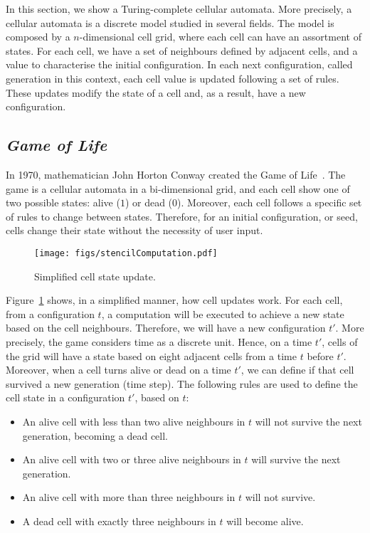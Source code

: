 \documentclass[12pt]{article}
\begin{document}
In this section, we show a Turing-complete cellular automata. More precisely, a cellular automata is a discrete model studied in several fields. The model is composed by a $n$-dimensional cell grid, where each cell can have an assortment of states. For each cell, we have a set of neighbours defined by adjacent cells, and a value to characterise the initial configuration. In each next configuration, called generation in this context, each cell value is updated following a set of rules. These updates modify the state of a cell and, as a result, have a new configuration.

\subsection{\emph{Game of Life}}

In 1970, mathematician John Horton Conway created the Game of Life~\cite{Gardner:article:1970:oct}. The game is a cellular automata in a bi-dimensional grid, and each cell show one of two possible states: alive ($1$) or dead ($0$). Moreover, each cell follows a specific set of rules to change between states. Therefore, for an initial configuration, or seed, cells change their state without the necessity of user input.

\begin{figure}[h]
    \centering
    \texttt{[image: figs/stencilComputation.pdf]}
    \caption{Simplified cell state update.}
    \label{fig:stencil}
\end{figure}

Figure~\ref{fig:stencil} shows, in a simplified manner, how cell updates work. For each cell, from a configuration $t$, a computation will be executed to achieve a new state based on the cell neighbours. Therefore, we will have a new configuration $t'$. More precisely, the game considers time as a discrete unit. Hence, on a time $t'$, cells of the grid will have a state based on eight adjacent cells from a time $t$ before $t'$. Moreover, when a cell turns alive or dead on a time $t'$, we can define if that cell survived a new generation (time step). The following rules are used to define the cell state in a configuration $t'$, based on $t$:

\begin{itemize}
    \item An alive cell with less than two alive neighbours in $t$ will not survive the next generation, becoming a dead cell.
    \item An alive cell with two or three alive neighbours in $t$ will survive the next generation.
    \item An alive cell with more than three neighbours in $t$ will not survive.
    \item A dead cell with exactly three neighbours in $t$ will become alive.
\end{itemize}
\end{document}
